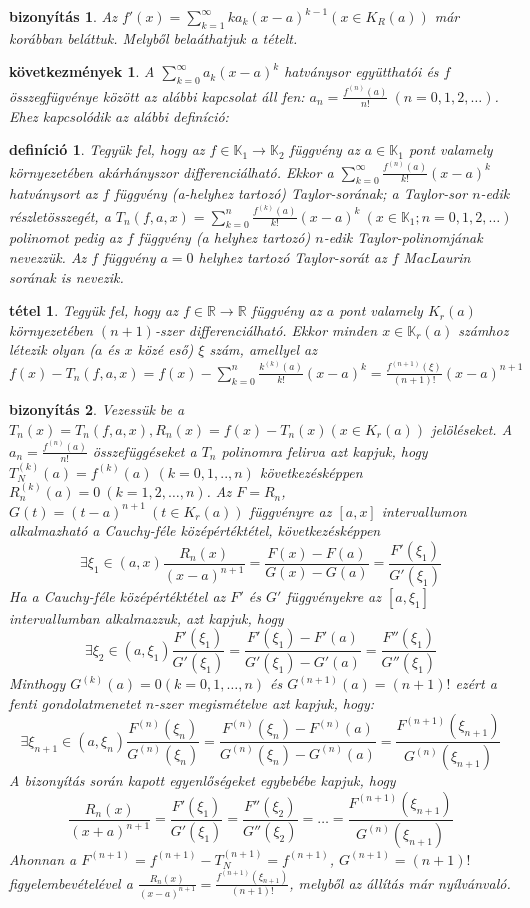 \documentclass{article}
\newcommand{\K}{\mathbb{K}}
\newcommand{\R}{\mathbb{R}}
\newcommand{\n}{\rightarrow}
\newcommand{\di}{\displaystyle}
\theoremstyle{magyar}
\newtheorem{de}{definíció}[section]
\newtheorem{te}{tétel}[section]
\newtheorem{bi}{bizonyítás}[section]
\newtheorem{ko}{következmények}[section]
\begin{document}
  \begin{bi}
    Az $f'(x)=\di\sum_{k=1}^\infty ka_k(x-a)^{k-1} (x\in K_R(a))$ már korábban beláttuk. Melyből belaáthatjuk a tételt.
  \end{bi}
  \begin{ko}
    A $\di\sum_{k=0}^{\infty}a_k(x-a)^k$ hatványsor együtthatói és $f$ összegfügvénye között az alábbi kapcsolat áll fen: $a_n=\di\frac{f^{(n)}(a)}{n!}\ (n=0,1,2,\ldots)$. Ehez kapcsolódik az alábbi definíció:
  \end{ko}
  \begin{de}
    Tegyük fel, hogy az $f\in\K_1\n\K_2$ függvény az $a\in\K_1$ pont valamely környezetében akárhányszor differenciálható. Ekkor a $\di\sum_{k=0}^\infty\frac{f^{(n)}(a)}{k!}(x-a)^k$ hatványsort az $f$ függvény (a-helyhez tartozó) Taylor-sorának; a Taylor-sor $n$-edik részletösszegét, a $T_n(f,a,x)=\di\sum_{k=0}^n\frac{f^{(k)}(a)}{k!}(x-a)^k\ (x\in\K_1; n=0,1,2,\ldots)$ polinomot pedig az $f$ függvény (a helyhez tartozó) $n$-edik Taylor-polinomjának nevezzük. Az $f$ függvény $a=0$ helyhez tartozó Taylor-sorát az $f$ MacLaurin sorának is nevezik.
  \end{de}
  \begin{te}
    Tegyük fel, hogy az $f\in\R\n\R$ függvény az $a$ pont valamely $K_r(a)$ környezetében $(n+1)$-szer differenciálható. Ekkor minden $x\in\K_r(a)$ számhoz létezik olyan ($a$ és $x$ közé eső) $\xi$ szám, amellyel az $\di f(x)-T_n(f,a,x)=f(x)-\sum_{k=0}^n\frac{k^{(k)}(a)}{k!}(x-a)^k=\frac{f^{(n+1)}(\xi)}{(n+1)!}(x-a)^{n+1}$
  \end{te}
  \begin{bi}
    Vezessük be a $T_n(x)=T_n(f,a,x), R_n(x)=f(x)-T_n(x) (x\in K_r(a))$ jelöléseket. A $a_n=\di\frac{f^{(n)}(a)}{n!}$ összefüggéseket a $T_n$ polinomra felirva azt kapjuk, hogy $T_N^{(k)}(a)=f^{(k)}(a)\ (k=0,1,..,n)$ következésképpen $R_n^{(k)}(a)=0\ (k=1,2,\ldots,n)$. Az $F=R_n$, $G(t)=(t-a)^{n+1}\ (t\in K_r(a))$ függvényre az $[a,x]$ intervallumon alkalmazható a Cauchy-féle középértéktétel, következésképpen
    \[\exists \xi_1\in(a,x)\frac{R_n(x)}{(x-a)^{n+1}}=\frac{F(x)-F(a)}{G(x)-G(a)}=\frac{F'(\xi_1)}{G'(\xi_1)}\]
    Ha a Cauchy-féle középértéktétel az $F'$ és $G'$ függvényekre az $[a,\xi_1]$ intervallumban alkalmazzuk, azt kapjuk, hogy
    \[\exists \xi_2\in(a,\xi_1)\frac{F'(\xi_1)}{G'(\xi_1)}=\frac{F'(\xi_1)-F'(a)}{G'(\xi_1)-G'(a)}=\frac{F''(\xi_1)}{G''(\xi_1)}\]
    Minthogy $G^{(k)}(a)=0 (k=0,1,\ldots,n)$ és $G^{(n+1)}(a)=(n+1)!$ ezért a fenti gondolatmenetet $n$-szer megismételve azt kapjuk, hogy:
    \[\exists \xi_{n+1}\in(a,\xi_n)\frac{F^{(n)}(\xi_n)}{G^{(n)}(\xi_n)}=\frac{F^{(n)}(\xi_n)-F^{(n)}(a)}{G^{(n)}(\xi_n)-G^{(n)}(a)}=\frac{F^{(n+1)}(\xi_{n+1})}{G^{(n)}(\xi_{n+1})}\]
    A bizonyítás során kapott egyenlőségeket egybebébe kapjuk, hogy
    \[\frac{R_n(x)}{(x+a)^{n+1}}=\frac{F'(\xi_1)}{G'(\xi_1)}=\frac{F''(\xi_2)}{G''(\xi_2)}=\ldots=\frac{F^{(n+1)}(\xi_{n+1})}{G^{(n)}(\xi_{n+1})} \]
    Ahonnan a $F^{(n+1)}=f^{(n+1)}-T_N^{(n+1)}=f^{(n+1)}$, $G^{(n+1)}=(n+1)!$ figyelembevételével a $\frac{R_n(x)}{(x-a)^{n+1}}=\frac{f^{(n+1)}(\xi_{n+1})}{(n+1)!}$, melyből az állítás már nyílvánvaló.
  \end{bi}
\end{document}

